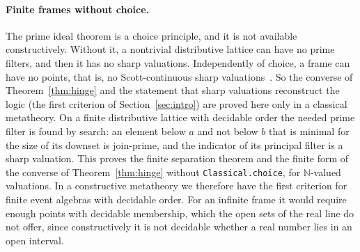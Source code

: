 \paragraph{Finite frames without choice.}
The prime ideal theorem is a choice principle, and it is not available
constructively. Without it, a nontrivial distributive lattice can have no
prime filters, and then it has no sharp valuations. Independently of
choice, a frame can have no points, that is, no Scott-continuous sharp
valuations~\cite{johnstone1982}. So the converse of
Theorem~\ref{thm:hinge} and the statement that sharp valuations
reconstruct the logic (the first criterion of Section~\ref{sec:intro})
are proved here only in a classical metatheory. On a finite distributive lattice with decidable order the
needed prime filter is found by search: an element below $a$ and not
below $b$ that is minimal for the size of its downset is join-prime, and
the indicator of its principal filter is a sharp valuation. This proves
the finite separation theorem and the finite form of the converse of
Theorem~\ref{thm:hinge} without
\texttt{Classical.choice},
for $\mathbb{N}$-valued valuations. In a constructive metatheory we
therefore have the first criterion for finite event algebras with
decidable order. For an infinite frame it would require enough points
with decidable membership, which the open sets of the real line do not
offer, since constructively it is not decidable whether a real number
lies in an open interval.

